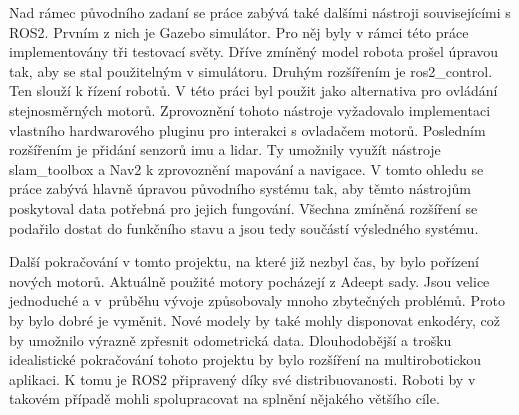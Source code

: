 Nad rámec původního zadaní se práce zabývá také dalšími nástroji souvisejícími s ROS2. Prvním z nich je Gazebo simulátor. Pro něj byly v rámci této práce implementovány tři testovací světy. Dříve zmíněný model robota prošel úpravou tak, aby se stal použitelným v simulátoru. Druhým rozšířením je ros2\_control. Ten slouží k řízení robotů. V této práci byl použit jako alternativa pro ovládání stejnosměrných motorů. Zprovoznění tohoto nástroje vyžadovalo implementaci vlastního hardwarového pluginu pro interakci s ovladačem motorů. Posledním rozšířením je přidání senzorů imu a lidar. Ty umožnily využít nástroje slam\_toolbox a Nav2 k zprovoznění mapování a navigace. V tomto ohledu se práce zabývá hlavně úpravou původního systému tak, aby těmto nástrojům poskytoval data potřebná pro jejich fungování. Všechna zmíněná rozšíření se podařilo dostat do funkčního stavu a jsou tedy součástí výsledného systému.

Další pokračování v tomto projektu, na které již nezbyl čas, by bylo pořízení nových motorů. Aktuálně  použité motory pocházejí z Adeept sady. Jsou velice jednoduché a v~průběhu vývoje způsobovaly mnoho zbytečných problémů. Proto by bylo dobré je vyměnit. Nové modely by také mohly disponovat enkodéry, což by umožnilo výrazně zpřesnit odometrická data.
Dlouhodobější a trošku idealistické pokračování tohoto projektu by bylo rozšíření na multirobotickou aplikaci. K tomu je ROS2 připravený díky své distribuovanosti. Roboti by v takovém případě mohli spolupracovat na splnění nějakého většího cíle.


%
